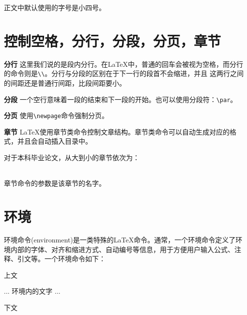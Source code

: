 正文中默认使用的字号是小四号。

\section{控制空格，分行，分段，分页，章节}
\begin{description}
\item{\textbf{分行}}
这里我们说的是段内分行。在\LaTeX 中，普通的回车会被视为空格，而分行的命令则是\verb|\\|。分行与分段的区别在于下一行的段首不会缩进，并且
这两行之间的间距还是普通行间距，比段间距要小。
\item{\textbf{分段}}
一个空行意味着一段的结束和下一段的开始。也可以使用分段符：\verb|\par|。
\item{\textbf{分页}}
使用\verb|\newpage|命令强制分页。
\item{\textbf{章节}}
\LaTeX 使用章节类命令控制文章结构。章节类命令可以自动生成对应的格式，并且会自动插入目录中。\par
对于本科毕业论文，从大到小的章节依次为：\\
\begin{minipage}{0.8\textwidth}
\begin{code}
    \chapter,\section,\subsection,\subsubsection
\end{code}
\end{minipage}\\
章节命令的参数是该章节的名字。
\end{description}

\section{环境}
环境命令(environment)是一类特殊的\LaTeX{}命令。通常，一个环境命令定义了环境内部的字体、对齐和缩进方式、自动编号等信息，用于方便用户输入公式、注释、引文等。一个环境命令如下：
\begin{code}
            上文
            \begin{环境名}
                ...
                环境内的文字
                ...
            \end{环境名}
            下文
\end{code}

